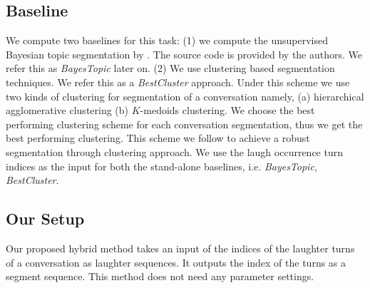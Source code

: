 \documentclass{article}
\begin{document}
\subsection{Baseline}\label{sec:bs}
We compute two baselines for this task: (1) we compute the unsupervised Bayesian topic segmentation by \cite{eisenstein-08}. The source code is provided by the authors. We refer this as \emph{BayesTopic} later on. (2) We use clustering based segmentation techniques. We refer this as a \emph{BestCluster} approach. Under this scheme we use two kinds of clustering for segmentation of a conversation namely, (a) hierarchical agglomerative clustering (b) $K$-medoids clustering. We choose the best performing clustering scheme for each conversation segmentation, thus we get the best performing clustering. This scheme we follow to achieve a robust segmentation through clustering approach. We use the laugh occurrence turn indices as the input for both the stand-alone baselines, i.e. \emph{BayesTopic}, \emph{BestCluster}.
\subsection{Our Setup}\label{sec:oset}
Our proposed hybrid method takes an input of the indices of the laughter turns of a conversation as laughter sequences. It outputs the index of the turns as a segment sequence. This method does not need any parameter settings.

\end{document}
